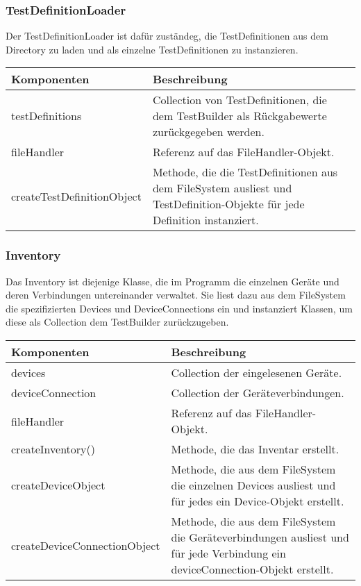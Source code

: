 \documentclass[
	ngerman,
	toc=listof, %
	toc=bibliography, %
	footnotes=multiple, %
	parskip=half, %
	numbers=noendperiod %
]{scrartcl}
\begin{document}
	\subsubsection{TestDefinitionLoader}
	Der TestDefinitionLoader ist dafür zuständeg, die TestDefinitionen aus dem Directory zu laden und als einzelne TestDefinitionen zu instanzieren.
	
	\begin{tabularx}{\textwidth}{lX}
		\toprule
			Komponenten & Beschreibung \\
		\midrule
			testDefinitions & Collection von TestDefinitionen, die dem TestBuilder als Rückgabewerte zurückgegeben werden. \\
			fileHandler & Referenz auf das FileHandler-Objekt. \\
		\midrule
			createTestDefinitionObject & Methode, die die TestDefinitionen aus dem FileSystem ausliest und TestDefinition-Objekte für jede Definition instanziert. \\
		\bottomrule
	\end{tabularx}

	\subsubsection{Inventory}
	Das Inventory ist diejenige Klasse, die im Programm die einzelnen Geräte und deren Verbindungen untereinander verwaltet. 
	Sie liest dazu aus dem FileSystem die spezifizierten Devices und DeviceConnections ein und instanziert Klassen, um diese als Collection dem TestBuilder zurückzugeben.

	\begin{tabularx}{\textwidth}{lX}
		\toprule
			Komponenten & Beschreibung \\
		\midrule
			devices & Collection der eingelesenen Geräte.\\
			deviceConnection & Collection der Geräteverbindungen. \\
			fileHandler & Referenz auf das FileHandler-Objekt.\\
		\midrule
			createInventory() & Methode, die das Inventar erstellt. \\
			createDeviceObject & Methode, die aus dem FileSystem die einzelnen Devices ausliest und für jedes ein Device-Objekt erstellt. \\
			createDeviceConnectionObject & Methode, die aus dem FileSystem die Geräteverbindungen ausliest und für jede Verbindung ein deviceConnection-Objekt erstellt.\\
		\bottomrule
	\end{tabularx}
	\newpage
\end{document}
